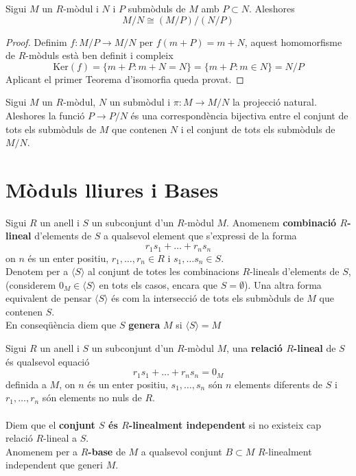 \begin{theorem}
Sigui $M$ un $R$-mòdul i $N$ i $P$ submòduls de $M$ amb $P\subset N$. Aleshores
$$
M/N\cong (M/P)/(N/P)
$$
\end{theorem}
\begin{proof} Definim $f: M/P\rightarrow M/N$ per $f(m+P)=m+N$, aquest homomorfisme de $R$-mòduls està ben definit i compleix
$$
\text{Ker}(f)=\{m+P : m+N=N \}=\{m+P : m\in N\}=N/P
$$
Aplicant el primer Teorema d'isomorfia queda provat.
\end{proof}

\begin{theorem}
Sigui $M$ un $R$-mòdul, $N$ un submòdul i $\pi: M\rightarrow M/N$ la projecció natural. Aleshores la funció $P\rightarrow P/N$ és una correspondència bijectiva entre el conjunt de tots els submòduls de $M$ que contenen $N$ i el conjunt de tots els submòduls de $M/N$.
\end{theorem}


\section{Mòduls lliures i Bases}
\begin{definition} Sigui $R$ un anell i $S$ un subconjunt d'un $R$-mòdul $M$. Anomenem \textbf{combinació $R$-lineal} d'elements de $S$ a qualsevol element que s'expressi de la forma $$r_1s_1+\dots +r_n s_n$$ on $n$ és un enter positiu, $r_1,\dots,r_n\in R$ i $s_1,\dots s_n\in S$.\\
Denotem per a $\langle S \rangle$ al conjunt de totes les combinacions $R$-lineals d'elements de $S$, (considerem $0_M\in \langle S \rangle$ en tots els casos, encara que $S=\emptyset$). Una altra forma equivalent de pensar $\langle S \rangle $ és com la intersecció de tots els submòduls de $M$ que contenen $S$. \\
En conseqüència diem que $S$ \textbf{genera} $M$ si $\langle S \rangle =M$\\ 
\end{definition}

\begin{definition}
Sigui $R$ un anell i $S$ un subconjunt d'un $R$-mòdul $M$, una \textbf{relació $R$-lineal} de $S$ és qualsevol equació 
$$
r_1s_1+\dots +r_ns_n=0_M
$$
definida a $M$, on $n$ és un enter positiu, $s_1,\dots , s_n$ són $n$ elements diferents de $S$ i $r_1 ,  \dots , r_n$ són elements no nuls de $R$.\\
\\
Diem que el \textbf{conjunt $S$ és $R$-linealment independent} si no existeix cap relació $R$-lineal a $S$.\\
Anomenem per a \textbf{$R$-base} de $M$ a qualsevol conjunt $B\subset M$ $R$-linealment independent que generi $M$.
\end{definition}

